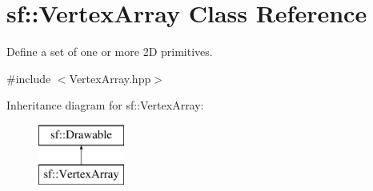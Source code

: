 \hypertarget{classsf_1_1_vertex_array}{}\section{sf\+:\+:Vertex\+Array Class Reference}
\label{classsf_1_1_vertex_array}


Define a set of one or more 2D primitives.  




{\ttfamily \#include $<$Vertex\+Array.\+hpp$>$}

Inheritance diagram for sf\+:\+:Vertex\+Array\+:\begin{figure}[H]
\begin{center}
\leavevmode
\includegraphics[height=2.000000cm]{classsf_1_1_vertex_array}
\end{center}
\end{figure}
